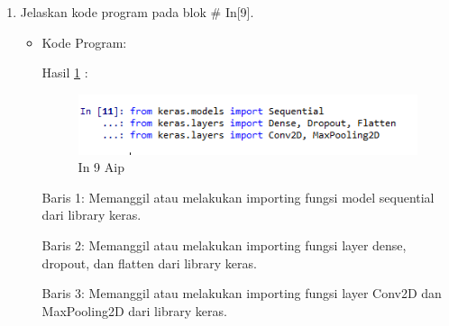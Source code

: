 \begin{enumerate}
\item Jelaskan kode program pada blok \# In[9].
\begin{itemize}
\item Kode Program:

\par Hasil \ref{in9aip} :
\begin{figure}[!hbtp]
\centering
\includegraphics[scale=0.7]{figures/AIP/prak9.PNG}
\caption{In 9 Aip}
\label{in9aip}
\end{figure}
\par Baris 1: Memanggil atau melakukan importing fungsi model sequential dari library keras.
\par Baris 2: Memanggil atau melakukan importing fungsi layer dense, dropout, dan flatten dari library keras.
\par Baris 3: Memanggil atau melakukan importing fungsi layer Conv2D dan MaxPooling2D dari library keras.
\end{itemize}
\par


\end{enumerate}

